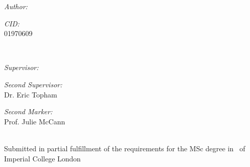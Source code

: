 \begin{titlepage}
\begin{minipage}{0.4\textwidth}
\begin{flushleft} \large
\emph{Author:}\\
\reportauthor %
\end{flushleft}
\medskip
\begin{flushleft} \large
\emph{CID:}\\
01970609
\end{flushleft}
\end{minipage}
~
\begin{minipage}{0.4\textwidth}
\begin{flushright} \large
\emph{Supervisor:} \\
\supervisor %
\end{flushright}
\medskip
\begin{flushright} \large
\emph{Second Supervisor:} \\
Dr. Eric Topham
\end{flushright}
\medskip
\begin{flushright} \large
\emph{Second Marker:} \\
Prof. Julie McCann
\end{flushright}
\end{minipage}\\[4cm]


\vfill %
Submitted in partial fulfillment of the requirements for the MSc degree in
\degreetype~of Imperial College London\\[0.5cm]

\makeatletter
\@date 
\makeatother


\end{titlepage}
